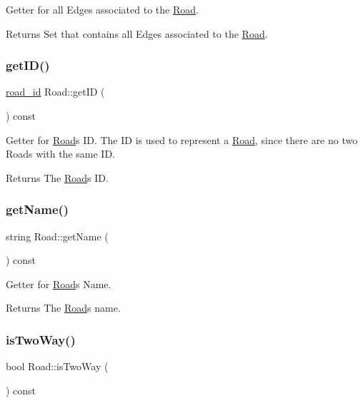 Getter for all Edges associated to the \hyperlink{class_road}{Road}.

\begin{DoxyReturn}{Returns}
Set that contains all Edges associated to the \hyperlink{class_road}{Road}. 
\end{DoxyReturn}
\hypertarget{class_road_a4e0440c1d5bf11800f0df3c50dcb4b92}{}\label{class_road_a4e0440c1d5bf11800f0df3c50dcb4b92} 
\subsubsection{\texorpdfstring{get\+I\+D()}{getID()}}
{\footnotesize\ttfamily \hyperlink{_road_8hpp_a8e0db0d135782948da5d293720dbfb46}{road\+\_\+id} Road\+::get\+ID (\begin{DoxyParamCaption}{ }\end{DoxyParamCaption}) const}

Getter for \hyperlink{class_road}{Road}\textquotesingle{}s ID. The ID is used to represent a \hyperlink{class_road}{Road}, since there are no two Roads with the same ID.

\begin{DoxyReturn}{Returns}
The \hyperlink{class_road}{Road}\textquotesingle{}s ID. 
\end{DoxyReturn}
\hypertarget{class_road_ae7c959eda8a11bc859ab5de5e278b735}{}\label{class_road_ae7c959eda8a11bc859ab5de5e278b735} 
\subsubsection{\texorpdfstring{get\+Name()}{getName()}}
{\footnotesize\ttfamily string Road\+::get\+Name (\begin{DoxyParamCaption}{ }\end{DoxyParamCaption}) const}

Getter for \hyperlink{class_road}{Road}\textquotesingle{}s Name.

\begin{DoxyReturn}{Returns}
The \hyperlink{class_road}{Road}\textquotesingle{}s name. 
\end{DoxyReturn}
\hypertarget{class_road_a9c412810b3a630a759f199c60f7f1cc6}{}\label{class_road_a9c412810b3a630a759f199c60f7f1cc6} 
\subsubsection{\texorpdfstring{is\+Two\+Way()}{isTwoWay()}}
{\footnotesize\ttfamily bool Road\+::is\+Two\+Way (\begin{DoxyParamCaption}{ }\end{DoxyParamCaption}) const}

